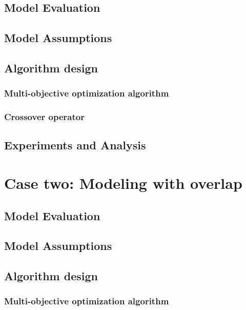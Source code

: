 \documentclass{mcmthesis}
\begin{document}
\subsection{Model Evaluation}%

\subsection{Model Assumptions}%

\subsection{Algorithm design}
\subsubsection{Multi-objective optimization algorithm}

\subsubsection{Crossover operator}

\subsection{Experiments and Analysis}%



\section{Case two: Modeling with overlap}
\subsection{Model Evaluation}%

\subsection{Model Assumptions}%

\subsection{Algorithm design}
\subsubsection{Multi-objective optimization algorithm}
\end{document}
